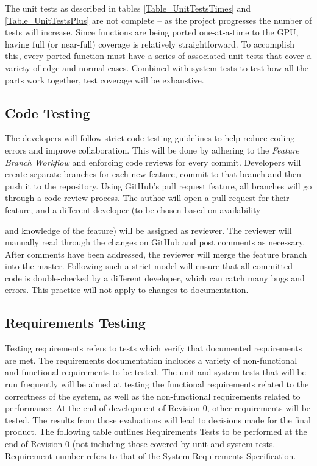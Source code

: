 \documentclass[12pt]{article}
\newcommand{\todo}[1]{\textcolor{red}{[TODO: #1]}} \else
\newcommand{\authornote}[3]{} \newcommand{\todo}[1]{} \fi
\newcommand{\ds}[1]{\authornote{blue}{DS}{#1}}
\newcommand{\mmp}[1]{\authornote{green}{MP}{#1}}
\begin{document}
The unit tests as described in tables \ref{Table_UnitTestsTimes} and \ref{Table_UnitTestsPlus} are not complete -- as the project progresses the number of tests will increase. Since functions are being ported one-at-a-time to the GPU, having full (or near-full) coverage is relatively straightforward. To accomplish this, every ported function must have a series of associated unit tests that cover a variety of edge and normal cases. Combined with system tests to test how all the parts work together, test coverage will be exhaustive.

\subsection{Code Testing} %
The developers will follow strict code testing guidelines to help reduce coding errors and improve collaboration. This will be done by adhering to the \emph{Feature Branch Workflow} and enforcing code reviews for every commit. Developers will create separate branches for each new feature, commit to that branch and then push it to the repository. Using GitHub's pull request feature, all branches will go through a code review process. The author will open a pull request for their feature, and a different developer (to be chosen based on availability
\ds{``availability"}\mmp{fixed spelling mistake}
and knowledge of the feature) will be assigned as reviewer. The reviewer will manually read through the changes on GitHub and post comments as necessary. After comments have been addressed, the reviewer will merge the feature branch into the master. Following such a strict model will ensure that all committed code is double-checked by a different developer, which can catch many bugs and errors. This practice will not apply to changes to documentation.

\subsection{Requirements Testing} %
Testing requirements refers to tests which verify that documented requirements are met. The requirements documentation includes a variety of non-functional and functional requirements to be tested. The unit and system tests that will be run frequently will be aimed at testing the functional requirements related to the correctness of the system, as well as the non-functional requirements related to performance. At the end of development of Revision 0, other requirements will be tested. The results from those evaluations will lead to decisions made for the final product. The following table outlines Requirements Tests to be performed at the end of Revision 0 (not including those covered by unit  and system tests. Requirement number refers to that of the System Requirements Specification.
\end{document}
